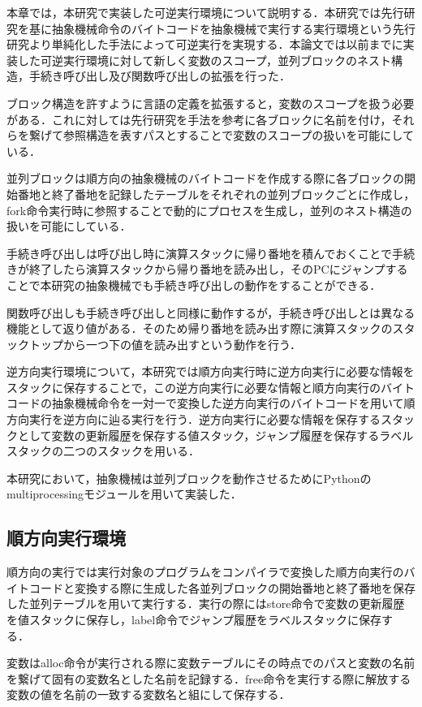 \documentclass[submit,PRO]{ipsj}
\begin{document}
本章では，本研究で実装した可逆実行環境について説明する．本研究では先行研究を基に抽象機械命令のバイトコードを抽象機械で実行する実行環境という先行研究より単純化した手法によって可逆実行を実現する．本論文では以前までに実装した可逆実行環境に対して新しく変数のスコープ，並列ブロックのネスト構造，手続き呼び出し及び関数呼び出しの拡張を行った．

ブロック構造を許すように言語の定義を拡張すると，変数のスコープを扱う必要がある．これに対しては先行研究を手法を参考に各ブロックに名前を付け，それらを繋げて参照構造を表すパスとすることで変数のスコープの扱いを可能にしている．

並列ブロックは順方向の抽象機械のバイトコードを作成する際に各ブロックの開始番地と終了番地を記録したテーブルをそれぞれの並列ブロックごとに作成し，fork命令実行時に参照することで動的にプロセスを生成し，並列のネスト構造の扱いを可能にしている．

手続き呼び出しは呼び出し時に演算スタックに帰り番地を積んでおくことで手続きが終了したら演算スタックから帰り番地を読み出し，そのPCにジャンプすることで本研究の抽象機械でも手続き呼び出しの動作をすることができる．

関数呼び出しも手続き呼び出しと同様に動作するが，手続き呼び出しとは異なる機能として返り値がある．そのため帰り番地を読み出す際に演算スタックのスタックトップから一つ下の値を読み出すという動作を行う．

逆方向実行環境について，本研究では順方向実行時に逆方向実行に必要な情報をスタックに保存することで，この逆方向実行に必要な情報と順方向実行のバイトコードの抽象機械命令を一対一で変換した逆方向実行のバイトコードを用いて順方向実行を逆方向に辿る実行を行う．逆方向実行に必要な情報を保存するスタックとして変数の更新履歴を保存する値スタック，ジャンプ履歴を保存するラベルスタックの二つのスタックを用いる．

本研究において，抽象機械は並列ブロックを動作させるためにPythonのmultiprocessingモジュールを用いて実装した．

\subsection{順方向実行環境}

順方向の実行では実行対象のプログラムをコンパイラで変換した順方向実行のバイトコードと変換する際に生成した各並列ブロックの開始番地と終了番地を保存した並列テーブルを用いて実行する．実行の際にはstore命令で変数の更新履歴を値スタックに保存し，label命令でジャンプ履歴をラベルスタックに保存する．

変数はalloc命令が実行される際に変数テーブルにその時点でのパスと変数の名前を繋げて固有の変数名とした名前を記録する．free命令を実行する際に解放する変数の値を名前の一致する変数名と組にして保存する．
\end{document}
